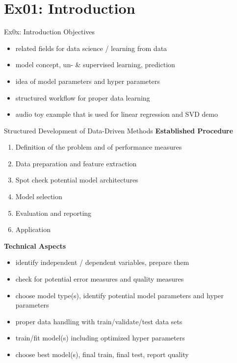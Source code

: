 \documentclass[mathserif, aspectratio=43]{intbeamer}
\begin{document}
\section{Ex01: Introduction}
\begin{frame}{Ex0x: Introduction}
Objectives
\begin{itemize}
\item related fields for data science / learning from data
\item model concept, un- \& supervised learning, prediction
\item idea of model parameters and hyper parameters
\item structured workflow for proper data learning
\item audio toy example that is used for linear regression and SVD demo
\end{itemize}
\end{frame}

\begin{frame}{Structured Development of Data-Driven Methods}
\textbf{Established Procedure}
\begin{enumerate}
\item Definition of the problem and of performance measures
\item Data preparation and feature extraction
\item Spot check potential model architectures
\item Model selection
\item Evaluation and reporting
\item Application
\end{enumerate}
\textbf{Technical Aspects}
\begin{itemize}
\item identify independent / dependent variables, prepare them
\item check for potential error measures and quality measures
\item choose model type(s), identify potential model parameters and hyper parameters
\item proper data handling with train/validate/test data sets
\item train/fit model(s) including optimized hyper parameters
\item choose best model(s), final train, final test, report quality
\end{itemize}
\end{frame}
\end{document}
